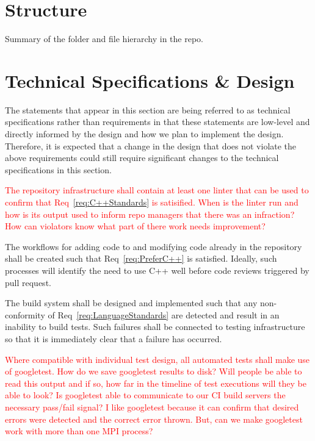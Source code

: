 \documentclass{article}
\begin{document}
\section{Structure}
Summary of the folder and file hierarchy in the repo.

\section{Technical Specifications \& Design}
The statements that appear in this section are being referred to as technical
specifications rather than requirements in that these statements are low-level
and directly informed by the design and how we plan to implement the design.
Therefore, it is expected that a change in the design that does not violate the
above requirements could still require significant changes to the technical
specifications in this section.\\

\textcolor{red}{
\begin{spec}
The repository infrastructure shall contain at least one linter that can be used
to confirm that Req~\ref{req:C++Standards} is satisified.  When is the linter
run and how is its output used to inform repo managers that there was an
infraction?  How can violators know what part of there work needs improvement?
\end{spec}}

\begin{spec}
The workflows for adding code to and modifying code already in the repository
shall be created such that Req~\ref{req:PreferC++} is satisfied.  Ideally, such
processes will identify the need to use C++ well before code reviews triggered
by pull request.
\end{spec}

\begin{spec}
The build system shall be designed and implemented such that any non-conformity
of Req~\ref{req:LanguageStandards} are detected and result in an inability to
build tests.  Such failures shall be connected to testing infrastructure so that
it is immediately clear that a failure has occurred.
\end{spec}

\textcolor{red}{
\begin{spec}
Where compatible with individual test design, all automated tests shall make use
of googletest.  How do we save googletest results to disk?  Will people be able
to read this output and if so, how far in the timeline of test executions will
they be able to look?  Is googletest able to communicate to our CI build servers
the necessary pass/fail signal?  I like googletest because it can confirm that
desired errors were detected and the correct error thrown.  But, can we make
googletest work with more than one MPI process?
\end{spec}}
\end{document}
